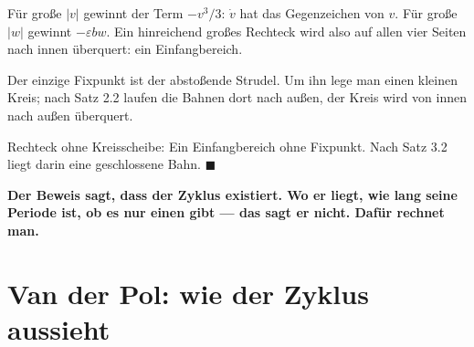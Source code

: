 \begin{merksatz}
Für große $|v|$ gewinnt der Term $-v^{3}/3$: $\dot v$ hat das Gegenzeichen von $v$. Für große $|w|$ gewinnt $-\varepsilon b w$. Ein hinreichend großes Rechteck wird also auf allen vier Seiten nach innen überquert: ein Einfangbereich.

Der einzige Fixpunkt ist der abstoßende Strudel. Um ihn lege man einen kleinen Kreis; nach Satz 2.2 laufen die Bahnen dort nach außen, der Kreis wird von innen nach außen überquert.

Rechteck ohne Kreisscheibe: Ein Einfangbereich ohne Fixpunkt. Nach Satz 3.2 liegt darin eine geschlossene Bahn. $\blacksquare$

\begin{center}
\begin{minipage}{0.9\textwidth}
\textbf{Der Beweis sagt, dass der Zyklus existiert. Wo er liegt, wie lang seine Periode ist, ob es nur einen gibt --- das sagt er nicht. Dafür rechnet man.}
\end{minipage}
\end{center}

\begin{center}
\begin{minipage}{0.88\textwidth}
\end{minipage}
\end{center}
\end{merksatz}

\section{Van der Pol: wie der Zyklus aussieht}

